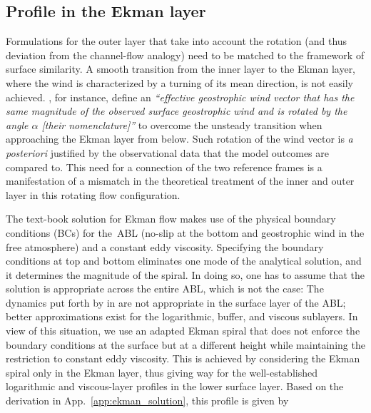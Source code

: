 \documentclass[smallcondensed,final]{svjour3}
\begin{document}
\subsection{Profile in the Ekman layer}
\label{sec:ekman}
%
Formulations for the outer layer that take into account the rotation
(and thus deviation from the channel-flow analogy)
need to be matched to the framework of surface similarity.
%
A smooth transition from the inner layer to the Ekman layer, where the wind is characterized by a turning
of its mean direction, is not easily achieved. 
%
\cite{optis:BM2014}, for instance, define an \emph{``effective geostrophic wind vector that has the same magnitude of the
observed surface geostrophic wind and is rotated by the angle $\alpha$ [their nomenclature]''} to overcome the
unsteady transition when approaching the Ekman layer from below.
%
Such rotation of the wind vector is \emph{a posteriori} justified by the observational data that the model outcomes are compared to.
%
This need for a connection of the two reference frames is a manifestation of a
mismatch in the theoretical treatment of the inner and outer layer in this rotating flow configuration. 
%
\par
%
The text-book solution for Ekman flow makes use of the physical boundary conditions (BCs) for
the~ABL (no-slip at the bottom and geostrophic wind in the free atmosphere) and a constant eddy
viscosity.
%
Specifying the boundary conditions at top and bottom eliminates one mode of the analytical solution, and
it determines the magnitude of the spiral.
%
In doing so, one has to assume that the solution is appropriate across the entire ABL, which is not the case:
The dynamics put forth by \citeauthor{ekman:AMA1905} in \citeyear{ekman:AMA1905}
are not appropriate in the surface layer of the ABL; better approximations exist for the logarithmic,
buffer, and viscous sublayers. 
%
In view of this situation, we use an adapted Ekman spiral that does not enforce the
boundary conditions at the surface but at a different height while maintaining the restriction 
to constant eddy viscosity. 
%
This is achieved by considering the Ekman spiral only in the Ekman layer,
thus giving way for the well-established logarithmic and viscous-layer profiles in the
lower surface layer. 
%
Based on the derivation in App.~\ref{app:ekman_solution}, this profile is given by 
\end{document}

